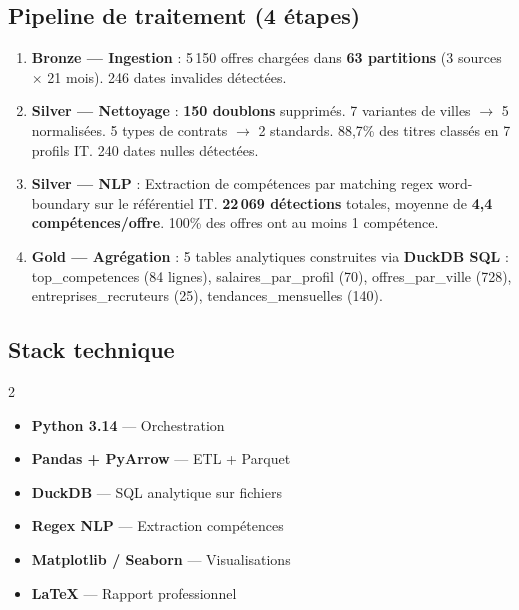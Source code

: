 \documentclass[12pt,a4paper]{article}
\begin{document}
\subsection{Pipeline de traitement (4 étapes)}

\begin{statbox}
\begin{enumerate}[leftmargin=*]
    \item \textbf{Bronze --- Ingestion} : 5\,150 offres chargées dans \textbf{63 partitions} (3 sources $\times$ 21 mois). 246 dates invalides détectées.
    \item \textbf{Silver --- Nettoyage} : \textbf{150 doublons} supprimés. 7 variantes de villes $\rightarrow$ 5 normalisées. 5 types de contrats $\rightarrow$ 2 standards. 88,7\% des titres classés en 7 profils IT. 240 dates nulles détectées.
    \item \textbf{Silver --- NLP} : Extraction de compétences par matching regex word-boundary sur le référentiel IT. \textbf{22\,069 détections} totales, moyenne de \textbf{4,4 compétences/offre}. 100\% des offres ont au moins 1 compétence.
    \item \textbf{Gold --- Agrégation} : 5 tables analytiques construites via \textbf{DuckDB SQL} : top\_competences (84 lignes), salaires\_par\_profil (70), offres\_par\_ville (728), entreprises\_recruteurs (25), tendances\_mensuelles (140).
\end{enumerate}
\end{statbox}

\subsection{Stack technique}
\begin{multicols}{2}
\begin{itemize}[leftmargin=*]
    \item \textbf{Python 3.14} --- Orchestration
    \item \textbf{Pandas + PyArrow} --- ETL + Parquet
    \item \textbf{DuckDB} --- SQL analytique sur fichiers
    \item \textbf{Regex NLP} --- Extraction compétences
    \item \textbf{Matplotlib / Seaborn} --- Visualisations
    \item \textbf{LaTeX} --- Rapport professionnel
\end{itemize}
\end{multicols}
\end{document}
